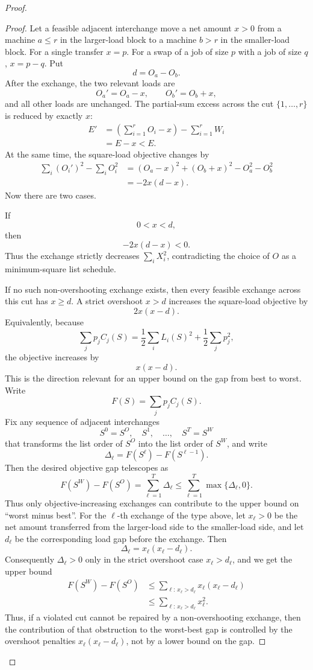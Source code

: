 \documentclass[11pt]{article}
\begin{document}
\begin{proof}
\begin{proof}
Let a feasible adjacent interchange move a net amount \(x>0\) from a machine
\(a\le r\) in the larger-load block to a machine \(b>r\) in the smaller-load
block. For a single transfer \(x=p\). For a swap of a job of size \(p\) with a
job of size \(q\), \(x=p-q\). Put
\[
        d=O_a-O_b.
\]
After the exchange, the two relevant loads are
\[
        O_a' = O_a-x,
        \qquad
        O_b' = O_b+x,
\]
and all other loads are unchanged. The partial-sum excess across the cut
\(\{1,\dots,r\}\) is reduced by exactly \(x\):
\[
\begin{aligned}
E'
&=
\left(\sum_{i=1}^r O_i-x\right)
-
\sum_{i=1}^r W_i  \\
&=
E-x
<
E.
\end{aligned}
\]
At the same time, the square-load objective changes by
\[
\begin{aligned}
\sum_i (O_i')^2-\sum_i O_i^2
&=
(O_a-x)^2+(O_b+x)^2-O_a^2-O_b^2 \\
&=
-2x(d-x).
\end{aligned}
\]
Now there are two cases.

If
\[
        0<x<d,
\]
then
\[
        -2x(d-x)<0.
\]
Thus the exchange strictly decreases \(\sum_i X_i^2\), contradicting the
choice of \(O\) as a minimum-square list schedule.

If no such non-overshooting exchange exists, then every feasible exchange
across this cut has \(x\ge d\). A strict overshoot \(x>d\) increases the
square-load objective by
\[
        2x(x-d).
\]
Equivalently, because
\[
        \sum_j p_j C_j(S)
        =
        \frac12\sum_i L_i(S)^2+\frac12\sum_j p_j^2,
\]
the objective increases by
\[
        x(x-d).
\]
This is the direction relevant for an upper bound on the gap from best to
worst. Write
\[
        F(S)=\sum_j p_j C_j(S).
\]
Fix any sequence of adjacent interchanges
\[
        S^0=S^O,\quad S^1,\quad \dots,\quad S^T=S^W
\]
that transforms the list order of \(S^O\) into the list order of \(S^W\), and
write
\[
        \Delta_\ell=F(S^\ell)-F(S^{\ell-1}).
\]
Then the desired objective gap telescopes as
\[
        F(S^W)-F(S^O)
        =
        \sum_{\ell=1}^T \Delta_\ell
        \leq
        \sum_{\ell=1}^T \max\{\Delta_\ell,0\}.
\]
Thus only objective-increasing exchanges can contribute to the upper bound on
``worst minus best''. For the \(\ell\)-th exchange of the type above, let
\(x_\ell>0\) be the net amount transferred from the larger-load side to the
smaller-load side, and let \(d_\ell\) be the corresponding load gap before the
exchange. Then
\[
        \Delta_\ell=x_\ell(x_\ell-d_\ell).
\]
Consequently \(\Delta_\ell>0\) only in the strict overshoot case
\(x_\ell>d_\ell\), and we get the upper bound
\[
\begin{aligned}
F(S^W)-F(S^O)
&\le
\sum_{\ell:\,x_\ell>d_\ell} x_\ell(x_\ell-d_\ell)  \\
&\le
\sum_{\ell:\,x_\ell>d_\ell} x_\ell^2 .
\end{aligned}
\]
Thus, if a violated cut cannot be repaired by a non-overshooting exchange, then
the contribution of that obstruction to the worst-best gap is controlled by the
overshoot penalties \(x_\ell(x_\ell-d_\ell)\), not by a lower bound on the gap.


\end{proof}
\end{proof}
\end{document}
